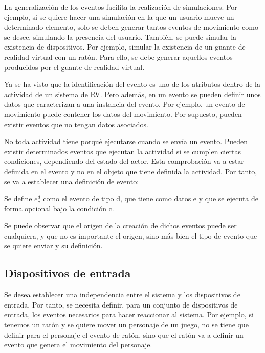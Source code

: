 \documentclass{egpubl}
\begin{document}
La generalizaci\'on de los eventos facilita la realizaci\'on de
simulaciones. Por ejemplo, si se quiere hacer una simulaci\'on en la
que un usuario mueve un determinado elemento, solo se deben generar
tantos eventos de {\textquotesingle}movimiento{\textquotesingle} como
se desee, simulando la presencia del usuario. Tambi\'en, se puede
simular la existencia de dispositivos. Por ejemplo, simular la
existencia de un guante de realidad virtual con un rat\'on. Para ello,
se debe generar aquellos eventos producidos por el guante de realidad
virtual.

Ya se ha visto que la identificaci\'on del evento es uno de los
atributos dentro de la actividad de un sistema de RV. Pero adem\'as, en
un evento se pueden definir unos datos que caracterizan a una instancia
del evento. Por ejemplo, un evento de movimiento puede contener los
datos del movimiento. Por supuesto, pueden existir eventos que no
tengan datos asociados.

No toda actividad tiene porqu\'e ejecutarse cuando se env\'ia un evento.
Pueden existir determinados eventos que ejecutan la actividad si se
cumplen ciertas condiciones, dependiendo del estado del actor. Esta
comprobaci\'on va a estar definida en el evento y no en el objeto que
tiene definida la actividad. Por tanto, se va a establecer una
definici\'on de evento:


\begin{itshape}
	Se define $e_{c}^{d}$ como el evento de tipo
	{\textquotesingle}d{\textquotesingle}, que tiene como datos
	{\textquotesingle}e{\textquotesingle} y que se ejecuta de forma
	opcional bajo la condici\'on {\textquotesingle}c{\textquotesingle}.
\end{itshape}


Se puede observar que el origen de la creaci\'on de dichos eventos
puede ser cualquiera, y que no es importante el origen, sino m\'as bien
el tipo de evento que se quiere enviar y su definici\'on.



\subsection{Dispositivos de entrada
\label{sec:dispositivos_entrada}}


Se desea establecer una independencia entre el sistema y los
dispositivos de entrada. Por tanto, se necesita definir, para un
conjunto de dispositivos de entrada, los eventos necesarios para hacer
reaccionar al sistema. Por ejemplo, si tenemos un rat\'on y se quiere
mover un personaje de un juego, no se tiene que definir para el
personaje el evento de rat\'on, sino que el rat\'on va a definir un
evento que genera el movimiento del personaje.
\end{document}
